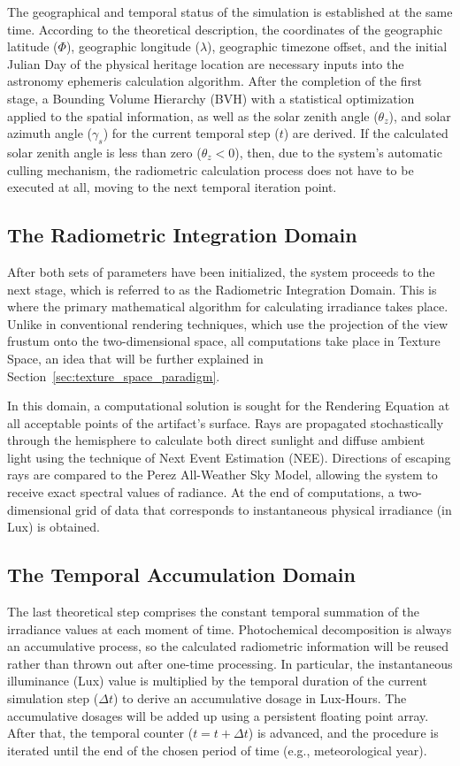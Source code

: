 The geographical and temporal status of the simulation is established at the same time. According to the theoretical description, the coordinates of the geographic latitude ($\Phi$), geographic longitude ($\lambda$), geographic timezone offset, and the initial Julian Day of the physical heritage location are necessary inputs into the astronomy ephemeris calculation algorithm. After the completion of the first stage, a Bounding Volume Hierarchy (BVH) with a statistical optimization applied to the spatial information, as well as the solar zenith angle ($\theta_z$), and solar azimuth angle ($\gamma_s$) for the current temporal step ($t$) are derived. If the calculated solar zenith angle is less than zero ($\theta_z < 0$), then, due to the system's automatic culling mechanism, the radiometric calculation process does not have to be executed at all, moving to the next temporal iteration point.

\subsection{The Radiometric Integration Domain}
After both sets of parameters have been initialized, the system proceeds to the next stage, which is referred to as the Radiometric Integration Domain. This is where the primary mathematical algorithm for calculating irradiance takes place. Unlike in conventional rendering techniques, which use the projection of the view frustum onto the two-dimensional space, all computations take place in Texture Space, an idea that will be further explained in Section~\ref{sec:texture_space_paradigm}.

In this domain, a computational solution is sought for the Rendering Equation at all acceptable points of the artifact's surface. Rays are propagated stochastically through the hemisphere to calculate both direct sunlight and diffuse ambient light using the technique of Next Event Estimation (NEE). Directions of escaping rays are compared to the Perez All-Weather Sky Model, allowing the system to receive exact spectral values of radiance. At the end of computations, a two-dimensional grid of data that corresponds to instantaneous physical irradiance (in Lux) is obtained.

\subsection{The Temporal Accumulation Domain}
The last theoretical step comprises the constant temporal summation of the irradiance values at each moment of time. Photochemical decomposition is always an accumulative process, so the calculated radiometric information will be reused rather than thrown out after one-time processing. In particular, the instantaneous illuminance (Lux) value is multiplied by the temporal duration of the current simulation step ($\Delta t$) to derive an accumulative dosage in Lux-Hours. The accumulative dosages will be added up using a persistent floating point array. After that, the temporal counter ($t = t + \Delta t$) is advanced, and the procedure is iterated until the end of the chosen period of time (e.g., meteorological year).

